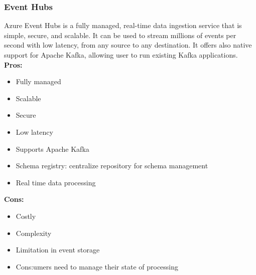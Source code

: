         \subsubsection{Event Hubs}
        \label{azure:event-hubs}
        Azure Event Hubs is a fully managed, real-time data ingestion service that is simple, secure, and scalable. It can be used to stream millions of events per second with low latency, from any source to any destination. It offers also native support for Apache Kafka, allowing user to run existing Kafka applications.\\
        \textbf{Pros:}
        \begin{itemize}
            \item Fully managed
            \item Scalable
            \item Secure
            \item Low latency
            \item Supports Apache Kafka
            \item Schema registry: centralize repository for schema management
            \item Real time data processing
        \end{itemize}
        \textbf{Cons:}
        \begin{itemize}
            \item Costly
            \item Complexity
            \item Limitation in event storage
            \item Cons:umers need to manage their state of processing
        \end{itemize}

